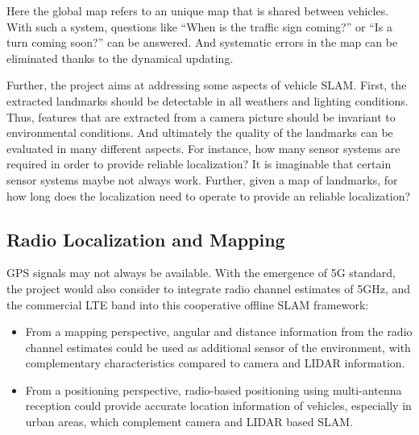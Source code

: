Here the global map refers to an unique map that is shared between
vehicles. With such a system, questions like ``When is the traffic sign
coming?'' or  ``Is a turn coming soon?'' can be answered. And systematic
errors in the map can be eliminated thanks to the dynamical updating.

Further, the project aims at addressing some aspects of vehicle
\gls{SLAM}. First, the extracted landmarks should be detectable in all
weathers and lighting conditions. Thus, features that are extracted
from a camera picture should be invariant to environmental
conditions. And ultimately the quality of the landmarks can be
evaluated in many different aspects. For instance, how many sensor
systems are required in order to provide reliable localization? It is
imaginable that certain sensor systems maybe not always work. Further,
given a map of landmarks, for how long does the localization need to
operate to provide an reliable localization?

\subsection{Radio Localization and Mapping}

GPS signals may not always be available. With the emergence of 5G
standard, the project would also consider to integrate radio channel
estimates of 5GHz, and the commercial LTE
band into this cooperative offline \gls{SLAM} framework:
\begin{itemize}
\item   From a mapping perspective, angular and distance information
  from the radio channel estimates could be used as additional sensor
  of the environment, with complementary characteristics compared to
  camera and LIDAR information.
\item From a positioning perspective, radio-based positioning using
multi-antenna reception could provide accurate location information of
vehicles, especially in urban areas, which complement camera and LIDAR
based SLAM.
\end{itemize}

